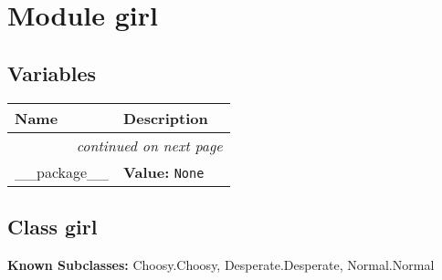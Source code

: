 %
%
%


\section{Module girl}

    \label{girl}


  \subsection{Variables}

    \vspace{-1cm}
\hspace{\varindent}\begin{longtable}{|p{\varnamewidth}|p{\vardescrwidth}|l}
\cline{1-2}
\cline{1-2} \centering \textbf{Name} & \centering \textbf{Description}& \\
\cline{1-2}
\endhead\cline{1-2}\multicolumn{3}{r}{\small\textit{continued on next page}}\\\endfoot\cline{1-2}
\endlastfoot\raggedright \_\-\_\-p\-a\-c\-k\-a\-g\-e\-\_\-\_\- & \raggedright \textbf{Value:} 
{\tt None}&\\
\cline{1-2}
\end{longtable}



\subsection{Class girl}

    \label{girl:girl}
\textbf{Known Subclasses:}
Choosy.Choosy,
    Desperate.Desperate,
    Normal.Normal

